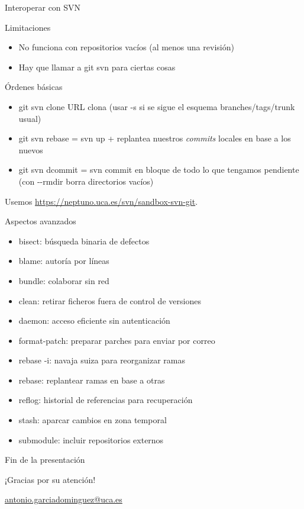 \documentclass[xcolor=svgnames]{beamer}
\newcommand*{\tipo}[1]{\textit{#1}}
\newcommand*{\inlinecmd}[1]{{\small\ttfamily\nohyphens{#1}}}
\begin{document}
\begin{frame}{Interoperar con SVN}

  \begin{block}{Limitaciones}
    \begin{itemize}
    \item No funciona con repositorios vacíos (al menos una revisión)
    \item Hay que llamar a \inlinecmd{git svn} para ciertas cosas
    \end{itemize}
  \end{block}

  \begin{block}{Órdenes básicas}
    \begin{itemize}
    \item \inlinecmd{git svn clone URL} clona (usar \inlinecmd{-s} si
      se sigue el esquema branches/tags/trunk usual)
    \item \inlinecmd{git svn rebase} = \inlinecmd{svn up} + replantea
      nuestros \tipo{commits} locales en base a los nuevos
    \item \inlinecmd{git svn dcommit} = \inlinecmd{svn commit} en
      bloque de todo lo que tengamos pendiente (con
      \inlinecmd{{-}-rmdir} borra directorios vacíos)
    \end{itemize}
  \end{block}

  Usemos \url{https://neptuno.uca.es/svn/sandbox-svn-git}.

\end{frame}

\appendix

\begin{frame}{Aspectos avanzados}
  \begin{itemize}
  \item \inlinecmd{bisect}: búsqueda binaria de defectos
  \item \inlinecmd{blame}: autoría por líneas
  \item \inlinecmd{bundle}: colaborar sin red
  \item \inlinecmd{clean}: retirar ficheros fuera de control de versiones
  \item \inlinecmd{daemon}: acceso eficiente sin autenticación
  \item \inlinecmd{format-patch}: preparar parches para enviar por correo
  \item \inlinecmd{rebase -i}: navaja suiza para reorganizar ramas
  \item \inlinecmd{rebase}: replantear ramas en base a otras
  \item \inlinecmd{reflog}: historial de referencias para recuperación
  \item \inlinecmd{stash}: aparcar cambios en zona temporal
  \item \inlinecmd{submodule}: incluir repositorios externos
  \end{itemize}
\end{frame}

\begin{frame}{Fin de la presentación}
  \begin{center}
    {\Huge ¡Gracias por su atención!}

    \vspace{3em}

    {\Large
      \href{mailto:antonio.garciadominguez@uca.es}{antonio.garciadominguez@uca.es}}
  \end{center}
\end{frame}
\end{document}
